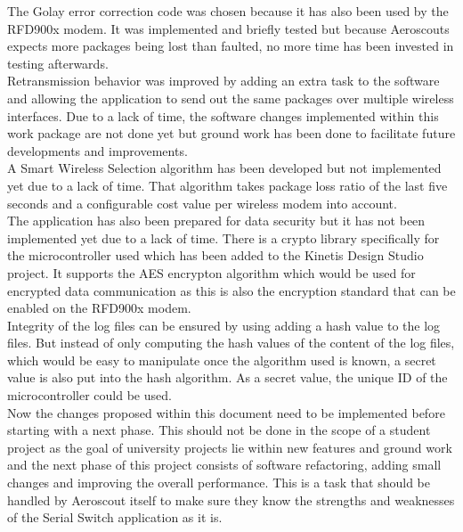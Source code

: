 The Golay error correction code was chosen because it has also been used by the RFD900x modem. It was implemented and briefly tested but because Aeroscouts expects more packages being lost than faulted, no more time has been invested in testing afterwards.\\
Retransmission behavior was improved by adding an extra task to the software and allowing the application to send out the same packages over multiple wireless interfaces. Due to a lack of time, the software changes implemented within this work package are not done yet but ground work has been done to facilitate future developments and improvements.\\
A Smart Wireless Selection algorithm has been developed but not implemented yet due to a lack of time. That algorithm takes package loss ratio of the last five seconds and a configurable cost value per wireless modem into account.\\
The application has also been prepared for data security but it has not been implemented yet due to a lack of time. There is a crypto library specifically for the microcontroller used which has been added to the Kinetis Design Studio project. It supports the AES encrypton algorithm which would be used for encrypted data communication as this is also the encryption standard that can be enabled on the RFD900x modem.\\
Integrity of the log files can be ensured by using adding a hash value to the log files. But instead of only computing the hash values of the content of the log files, which would be easy to manipulate once the algorithm used is known, a secret value is also put into the hash algorithm. As a secret value, the unique ID of the microcontroller could be used.\\
Now the changes proposed within this document need to be implemented before starting with a next phase. This should not be done in the scope of a student project as the goal of university projects lie within new features and ground work and the next phase of this project consists of software refactoring, adding small changes and improving the overall performance. This is a task that should be handled by Aeroscout itself to make sure they know the strengths and weaknesses of the Serial Switch application as it is.
%
%
%
%
%
%
%
